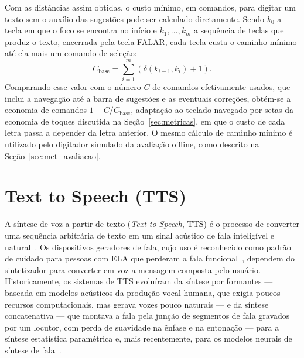 Com as distâncias assim obtidas, o custo mínimo, em comandos, para digitar um texto sem o auxílio das sugestões pode ser calculado diretamente. Sendo $k_0$ a tecla em que o foco se encontra no início e $k_1, \ldots, k_m$ a sequência de teclas que produz o texto, encerrada pela tecla FALAR, cada tecla custa o caminho mínimo até ela mais um comando de seleção:
\begin{equation}
    C_{\text{base}} = \sum_{i=1}^{m} \left( \delta(k_{i-1}, k_i) + 1 \right).
    \label{eq:custo_base}
\end{equation}
Comparando esse valor com o número $C$ de comandos efetivamente usados, que inclui a navegação até a barra de sugestões e as eventuais correções, obtém-se a economia de comandos $1 - C/C_{\text{base}}$, adaptação ao teclado navegado por setas da economia de toques discutida na Seção~\ref{sec:metricas}, em que o custo de cada letra passa a depender da letra anterior. O mesmo cálculo de caminho mínimo é utilizado pelo digitador simulado da avaliação offline, como descrito na Seção~\ref{sec:met_avaliacao}.

\section{Text to Speech (TTS)} \label{sec:tts}

A síntese de voz a partir de texto (\textit{Text-to-Speech}, TTS) é o processo de converter uma sequência arbitrária de texto em um sinal acústico de fala inteligível e natural~\cite{tan2021survey}. Os dispositivos geradores de fala, cujo uso é reconhecido como padrão de cuidado para pessoas com \gls{ELA} que perderam a fala funcional~\cite{beukelman2011communication}, dependem do sintetizador para converter em voz a mensagem composta pelo usuário. Historicamente, os sistemas de TTS evoluíram da síntese por formantes --- baseada em modelos acústicos da produção vocal humana, que exigia poucos recursos computacionais, mas gerava vozes pouco naturais --- e da síntese concatenativa --- que montava a fala pela junção de segmentos de fala gravados por um locutor, com perda de suavidade na ênfase e na entonação --- para a síntese estatística paramétrica e, mais recentemente, para os modelos neurais de síntese de fala~\cite{tan2021survey}.

